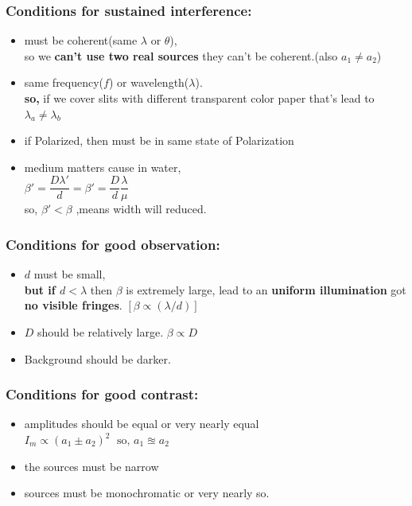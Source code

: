 \documentclass[legalpaper,10pt]{article}
\begin{document}
\begin{multicols*}{2}
	\subsubsection*{Conditions for sustained interference:}
	\begin{itemize}
		\item must be coherent(same $\lambda$ or $\theta$),\\so we \textbf{can't use two real sources} they can't be coherent.(also $a_1\ne a_2$)
		\item same frequency($f$) or wavelength($\lambda$).\\\textbf{so,} if we cover slits with different transparent color paper that's lead to $\lambda_a \ne \lambda_b$
		\item if Polarized, then must be in same state of Polarization
		\item medium matters cause in water,\\ \(\beta'=\dfrac{D{\lambda}'}{d} = \beta'=\dfrac{D}{d}\dfrac{\lambda}{\mu}\)\\ so, $\beta{'} < \beta$ ,means width will reduced.
	\end{itemize}
	\subsubsection*{Conditions for good observation:}
	\begin{itemize}
		\item \(d\) must be small,\\\textbf{but if \({d<\lambda}\)} then $\beta$ is extremely large, lead to an \textbf{uniform illumination} got \textbf{no visible fringes}. \([\beta\propto(\lambda/d)]\)
		\item \(D\) should be relatively large. \(\beta \varpropto  D \)
		\item Background should be darker.
	\end{itemize}
	\subsubsection*{Conditions for good  contrast:}
	\begin{itemize}
		\item amplitudes should be equal or very nearly equal \(I_{m} \propto (a_1 \pm a_2)^2\; \text{  so, }a_1 \approxeq a_2\)
		\item the sources must be narrow
		\item sources must be monochromatic or very nearly so.
	\end{itemize}

\end{multicols*}
\end{document}

